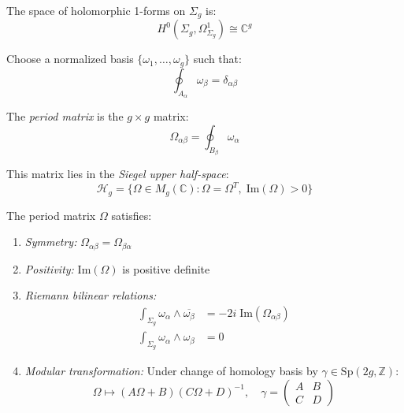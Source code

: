 \begin{definition}
\label{def:holomorphic-differentials}
The space of holomorphic 1-forms on $\Sigma_g$ is:
\begin{equation}
H^0(\Sigma_g, \Omega^1_{\Sigma_g}) \cong \mathbb{C}^g
\end{equation}

Choose a normalized basis $\{\omega_1, \ldots, \omega_g\}$ such that:
\begin{equation}
\oint_{A_\alpha} \omega_\beta = \delta_{\alpha\beta}
\end{equation}
\end{definition}

\begin{definition}
\label{def:period-matrix}
The \emph{period matrix} is the $g \times g$ matrix:
\begin{equation}
\Omega_{\alpha\beta} = \oint_{B_\beta} \omega_\alpha
\end{equation}

This matrix lies in the \emph{Siegel upper half-space}:
\begin{equation}
\mathcal{H}_g = \{\Omega \in M_g(\mathbb{C}) : \Omega = \Omega^T, \; \text{Im}(\Omega) > 0\}
\end{equation}
\end{definition}

\begin{theorem}
\label{thm:period-matrix-properties}
The period matrix $\Omega$ satisfies:
\begin{enumerate}
\item \emph{Symmetry:} $\Omega_{\alpha\beta} = \Omega_{\beta\alpha}$
\item \emph{Positivity:} $\text{Im}(\Omega)$ is positive definite
\item \emph{Riemann bilinear relations:}
\begin{align}
\int_{\Sigma_g} \omega_\alpha \wedge \overline{\omega_\beta} &= -2i \; \text{Im}(\Omega_{\alpha\beta})\\
\int_{\Sigma_g} \omega_\alpha \wedge \omega_\beta &= 0
\end{align}
\item \emph{Modular transformation:} Under change of homology basis by $\gamma \in \text{Sp}(2g, \mathbb{Z})$:
\begin{equation}
\Omega \mapsto (A\Omega + B)(C\Omega + D)^{-1}, \quad \gamma = \begin{pmatrix} A & B \\ C & D \end{pmatrix}
\end{equation}
\end{enumerate}
\end{theorem}

